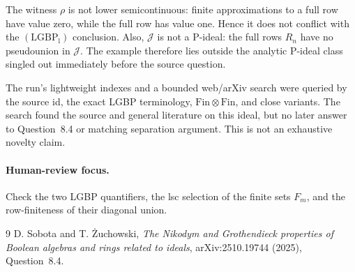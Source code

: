 \documentclass[11pt]{article}
\newcommand{\Fin}{\mathrm{Fin}}
\newcommand{\LGBPl}{\mathrm{(LGBP_l)}}
\newcommand{\cJ}{\mathcal{J}}
\begin{document}
The witness \(\rho\) is not lower semicontinuous: finite approximations to a
full row have value zero, while the full row has value one.  Hence it does not
conflict with the \(\LGBPl\) conclusion.  Also, \(\cJ\) is not a P-ideal:
the full rows \(R_n\) have no pseudounion in \(\cJ\).  The example therefore
lies outside the analytic P-ideal class singled out immediately before the
source question.

The run's lightweight indexes and a bounded web/arXiv search were queried by
the source id, the exact LGBP terminology, \(\Fin\otimes\Fin\), and close
variants.  The search found the source and general literature on this ideal,
but no later answer to Question~8.4 or matching separation argument.  This is
not an exhaustive novelty claim.

\paragraph{Human-review focus.}
Check the two LGBP quantifiers, the lsc selection of the finite sets \(F_m\),
and the row-finiteness of their diagonal union.

\begin{thebibliography}{9}
D. Sobota and T. \.{Z}uchowski,
\emph{The Nikodym and Grothendieck properties of Boolean algebras and rings
related to ideals}, arXiv:2510.19744 (2025), Question~8.4.
\end{thebibliography}
\end{document}
